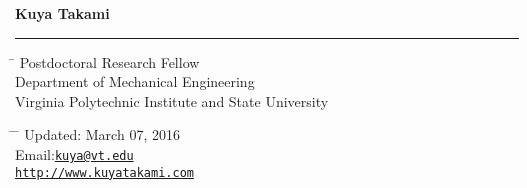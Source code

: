 \documentclass[11pt,letter]{article}
\begin{document}
{\bf \Large \noindent Kuya Takami}\vspace{-2mm}\\
\rule{\textwidth}{1.7pt}

\parbox{0.4\textwidth}{ %
\begin{tabbing} %
		\hspace{1cm} \= \kill %
		 \> Postdoctoral Research Fellow\\ %
		\> Department of Mechanical Engineering \\
		 \>  Virginia Polytechnic Institute and State University
\end{tabbing}}
\hfill %
\parbox{0.4\textwidth}{ %
	\begin{tabbing} %
		\hspace{1cm} \= \hspace{4cm} \= \kill %
		\> Updated: March 07, 2016 \\ %
		\> Email:\href{mailto:kuya@vt.edu}{\tt kuya@vt.edu}  \\ %
		\> \href{http://www.kuyatakami.com}{\tt http://www.kuyatakami.com}
	\end{tabbing}
}\\
\end{document}
